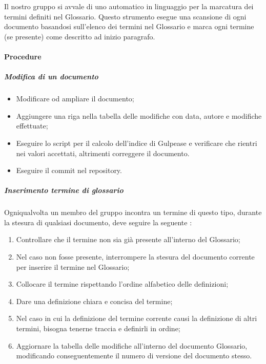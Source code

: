 Il nostro gruppo si avvale di uno  automatico in linguaggio  per la marcatura dei termini definiti nel Glossario. Questo strumento esegue una scansione di ogni documento basandosi sull'elenco dei termini nel Glossario e marca ogni termine (se presente) come descritto ad inizio paragrafo.



\paragraph{Procedure}

\subparagraph{Modifica di un documento}
\begin{itemize}
\item Modificare od ampliare il documento;
\item Aggiungere una riga nella tabella delle modifiche con data, autore e modifiche effettuate;
\item Eseguire lo script per il calcolo dell'indice di Gulpease e verificare che rientri nei valori accettati, altrimenti correggere il documento.
\item Eseguire il commit nel repository. 
\end{itemize}

\subparagraph{Inserimento termine di glossario}
Ogniqualvolta un membro del gruppo incontra un termine di questo tipo, durante la stesura di qualsiasi documento, deve seguire la seguente :
\begin{enumerate}
\item Controllare che il termine non sia già presente all'interno del Glossario;
\item Nel caso non fosse presente, interrompere la stesura del documento corrente per inserire il termine nel Glossario;
\item Collocare il termine rispettando l'ordine alfabetico delle definizioni;
\item Dare una definizione chiara e concisa del termine;
\item Nel caso in cui la definizione del termine corrente causi la definizione di altri termini, bisogna tenerne traccia e definirli in ordine;
\item Aggiornare la tabella delle modifiche all'interno del documento Glossario, modificando conseguentemente il numero di versione del documento stesso.
\end{enumerate}

